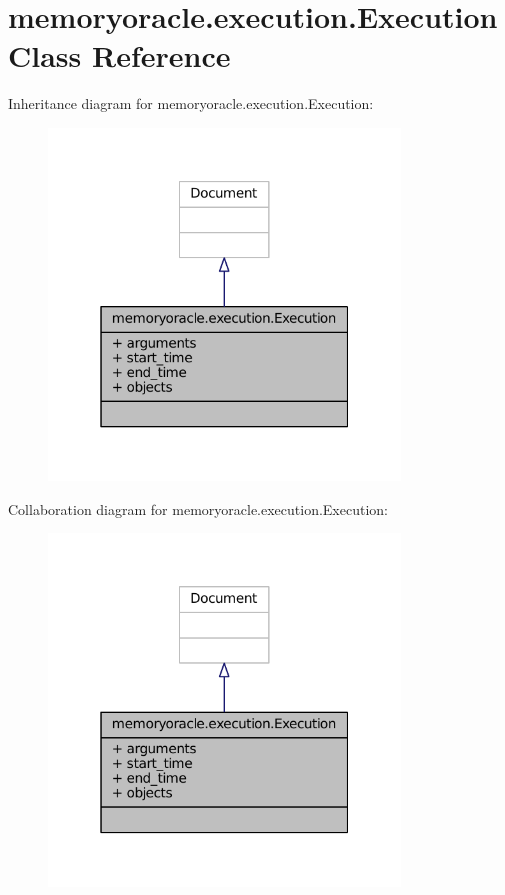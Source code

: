\hypertarget{classmemoryoracle_1_1execution_1_1Execution}{}\section{memoryoracle.\+execution.\+Execution Class Reference}
\label{classmemoryoracle_1_1execution_1_1Execution}


Inheritance diagram for memoryoracle.\+execution.\+Execution\+:
\nopagebreak
\begin{figure}[H]
\begin{center}
\leavevmode
\includegraphics[width=265pt]{classmemoryoracle_1_1execution_1_1Execution__inherit__graph}
\end{center}
\end{figure}


Collaboration diagram for memoryoracle.\+execution.\+Execution\+:
\nopagebreak
\begin{figure}[H]
\begin{center}
\leavevmode
\includegraphics[width=265pt]{classmemoryoracle_1_1execution_1_1Execution__coll__graph}
\end{center}
\end{figure}
